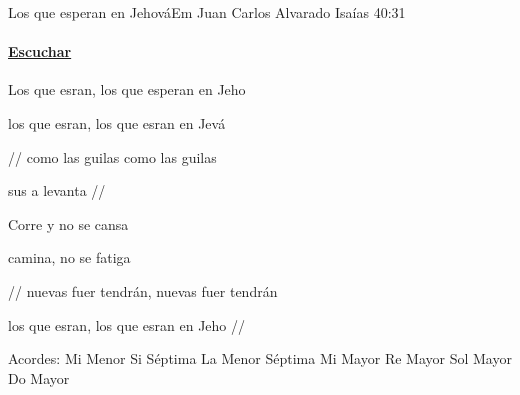 \documentclass[12pt, spanish]{book}
\begin{document}
    \begin{song}{Los que esperan en Jehová}{Em}
    {} %
    {Juan Carlos Alvarado}
    {Isaías 40:31} %
    {}
        \ifChordBk
        \paragraph{\mbox{}\hfill\protect\href{https://open.spotify.com/intl-es/track/2UfCP5nIomndfh65Mrw2zu}{Escuchar}\mbox{}\hfill}
        \fi

        \begin{SBOpGroup}
            Los que esran, los que esperan en Jeho

            los que esran, los que esran en Jevá

            // como las guilas  como las guilas

            sus a      levanta //
        \end{SBOpGroup}

        \begin{SBChorus}
            Corre y no se cansa

            camina, no se fatiga

            // nuevas fuer tendrán,  nuevas fuer tendrán

            los que esran, los que esran en Jeho //
        \end{SBChorus}

        \ifChordBk
        \begin{SBOpGroup}
            Acordes:
            \upchord{\Em}\qquad Mi Menor \hfill
            \upchord{\Bseven}\qquad Si S\'eptima \hfill\null\break
            \upchord{\Amseven}\qquad La Menor S\'eptima \hfill
            \upchord{\E}\qquad Mi Mayor \hfill
            \upchord{\D}\qquad Re Mayor \hfill\null\break
            \upchord{\G}\qquad Sol Mayor \hfill
            \upchord{\C}\qquad Do Mayor \hfill\null\break
        \end{SBOpGroup}
        \fi
    \end{song}
\end{document}

